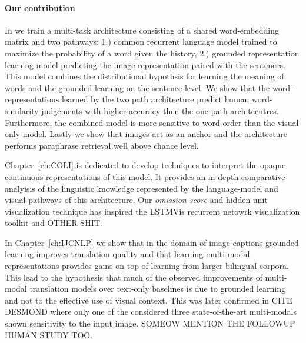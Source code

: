 \paragraph{Our contribution}


In \cite{chrupala2015learning} we train a multi-task architecture consisting
of a shared word-embedding matrix and two pathways: 1.) common recurrent language
model trained to maximize the probability of a word given the history,
2.) grounded representation learning model predicting the image representation paired with the sentences.
This model combines the distributional hypothsis for learning the meaning of words
and the grounded learning on the sentence level.
We show that the word-representations learned by the two path architecture
predict human word-similarity judgements with higher accuracy then the one-path
architecutres. Furthermore, the combined model is more sensitive to word-order than
the visual-only model.  Lastly we show that images act as an
anchor and the architecture performs paraphrase retrieval well above chance
level.

Chapter~\ref{ch:COLI} is dedicated to develop techniques to interpret the
opaque continuous representations of this model. It provides an in-depth
comparative analyisis of the linguistic knowledge represented by the
language-model and visual-pathways of this architecture. Our
\emph{omission-score} and hidden-unit visualization technique has inspired the
LSTMVis recurrent netowrk visualization toolkit \cite{strobelt2018lstmvis} and
OTHER SHIT.

In Chapter~\ref{ch:IJCNLP} we show that in the domain of image-captions
grounded learning improves translation quality and that learning multi-modal
representations provides gains on top of learning from larger bilingual corpora.
This lead to the hypothesis that much of the observed improvements of
multi-modal translation models over text-only baselines is due to grounded
learning and not to the effective use of visual context. This was later confirmed
in CITE DESMOND where only one of the considered three state-of-the-art multi-modals
shown sensitivity to the input image. SOMEOW MENTION THE FOLLOWUP HUMAN STUDY TOO.


